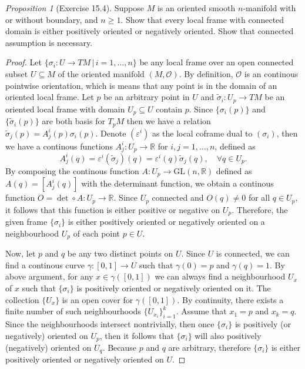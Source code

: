 \documentclass[a4paper]{article}
\theoremstyle{remark}
\newtheorem{prop}{Proposition}
\newcommand{\er}{\mathbb{R}} %
\newcommand{\subhim}{\subseteq} %
\newcommand{\GL}{\text{GL}(n,\er)} %
\newcommand\wtilde[1]{\widetilde{#1}} %
\begin{document}
\begin{prop}[Exercise 15.4]
Suppose $M$ is an oriented smooth $n$-manifold with or without boundary, and $n\geq 1$. Show that every local frame with connected domain is either positively oriented or negatively oriented. Show that connected assumption is necessary.
\end{prop}
\begin{proof}
Let $\{\sigma_i : U \to TM \, | \, i=1,\dots,n \}$ be any local frame over an open connected subset $U \subhim M$ of the oriented manifold $(M , \mathcal{O})$. By definition, $\mathcal{O}$ is an continous pointwise orientation, which is means that any point is in the domain of an oriented local frame. Let $p$ be an arbitrary point in $U$ and $\wtilde{\sigma}_i : U_p \to TM$ be an oriented local frame with domain $U_p\subhim U$ contain $p$. Since $\{\sigma_i(p)\}$ and $\{\wtilde{\sigma}_i(p)\}$ are both basis for $T_pM$ then we have a relation $\wtilde{\sigma}_j(p) = A^i_j(p) \sigma_i(p)$. Denote $(\varepsilon^i)$ as the local coframe dual to $(\sigma_i)$, then we have a continous functions $A^i_j : U_p \to \er $ for $i,j=1,\dots,n$, defined as
$$
A^i_j(q) = \varepsilon^i (\wtilde{\sigma}_j)(q) = \varepsilon^i(q) \wtilde{\sigma}_j(q), \quad \forall q \in U_p.
$$  
By composing the continous function $A : U_p \to \GL$ defined as $A(q) = [A^i_j(q)]$ with the determinant function, we obtain a continous function $O = \det \circ A : U_p \to \er$. Since $U_p$ connected and $O(q) \neq 0$ for all $q\in U_p$, it follows that this function is either positive or negative on $U_p$.  Therefore, the given frame $\{\sigma_i\}$ is either positively oriented or negatively oriented on a neighbourhood $U_p$ of each point $p \in U$. 
 
Now, let $p$ and $q$ be any two distinct points on $U$. 
Since $U$ is connected, we can find a continous curve $\gamma : [0,1] \to U$ such that $\gamma(0)=p$ and $\gamma(q) = 1$. By above argument, for any $x \in \gamma([0,1])$ we can always find a neighbourhood $U_x$ of $x$ such that $\{\sigma_i\}$ is positively oriented or negatively oriented on it. The collection $\{U_x\}$ is an open cover for $\gamma([0,1])$. By continuity, there exists a finite number of such neighbourhoods $\{U_{x_i}\}_{i=1}^k$. Assume that $x_1= p$ and $x_k=q$. Since the neighbourhoods intersect nontrivially, then once $\{\sigma_i\}$ is positively (or negatively) oriented on $U_p$, then it follows that $\{\sigma_i\}$ will also positively (negatively) oriented on $U_q$. Because $p$ and $q$ are arbitrary, therefore $\{\sigma_i\}$ is either positively oriented or negatively oriented on $U$.       
\end{proof}
\end{document}
